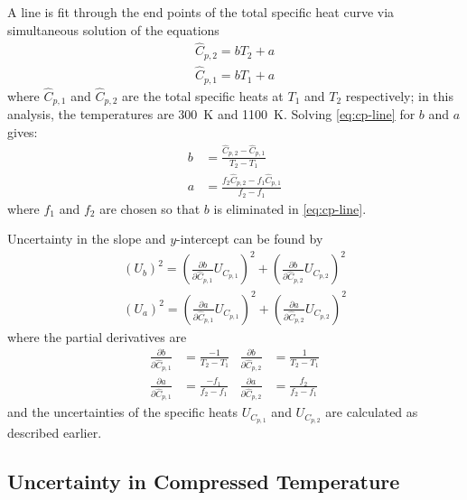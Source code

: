 \documentclass[../main.tex]{subfiles}
\begin{document}
A line is fit through the end points of the total specific heat curve
via simultaneous solution of the equations
%
\begin{equation}
\label{eq:cp-line}
\begin{split}
\hat{C}_{p,2} = b T_2 + a \\
\hat{C}_{p,1} = b T_1 + a
\end{split}
\end{equation}
%
where $\hat{C}_{p,1}$ and $\hat{C}_{p,2}$ are the total specific heats
at $T_1$ and $T_2$ respectively; in this analysis, the temperatures are
\SI{300}{\kelvin} and \SI{1100}{\kelvin}. Solving \cref{eq:cp-line} for
$b$ and $a$ gives:
%
\begin{equation}
\begin{split}
b &= \frac{\hat{C}_{p,2} - \hat{C}_{p,1}}{T_2 - T_1} \\[0.5em]
a &= \frac{f_2 \hat{C}_{p,2} - f_1 \hat{C}_{p,1}}{f_2-f_1}
\end{split}
\end{equation}
%
where $f_1$ and $f_2$ are chosen so that $b$ is eliminated in
\cref{eq:cp-line}.

Uncertainty in the slope and $y$-intercept can be found by
%
\begin{equation}
\begin{split}
\left(U_{b}\right)^2 = \left(\frac{\partial b}{\partial \hat{C}_{p,1}}U_{C_{p,1}}\right)^2 + \left(\frac{\partial b}{\partial \hat{C}_{p,2}}U_{C_{p,2}}\right)^2 \\[0.5em]
\left(U_{a}\right)^2 = \left(\frac{\partial a}{\partial \hat{C}_{p,1}}U_{C_{p,1}}\right)^2 + \left(\frac{\partial a}{\partial \hat{C}_{p,2}}U_{C_{p,2}}\right)^2
\end{split}
\end{equation}
%
where the partial derivatives are
%
\begin{align}
\frac{\partial b}{\partial \hat{C}_{p,1}} &= \frac{-1}{T_2 - T_1} & \frac{\partial b}{\partial \hat{C}_{p,2}} &= \frac{1}{T_2 - T_1} \\
\frac{\partial a}{\partial \hat{C}_{p,1}} &= \frac{-f_1}{f_2 - f_1} & \frac{\partial a}{\partial \hat{C}_{p,2}} &= \frac{f_2}{f_2 - f_1}
\end{align}
%
and the uncertainties of the specific heats $U_{C_{p,1}}$ and $U_{C_{p,2}}$
are calculated as described earlier.

\subsection{Uncertainty in Compressed Temperature}
\end{document}

